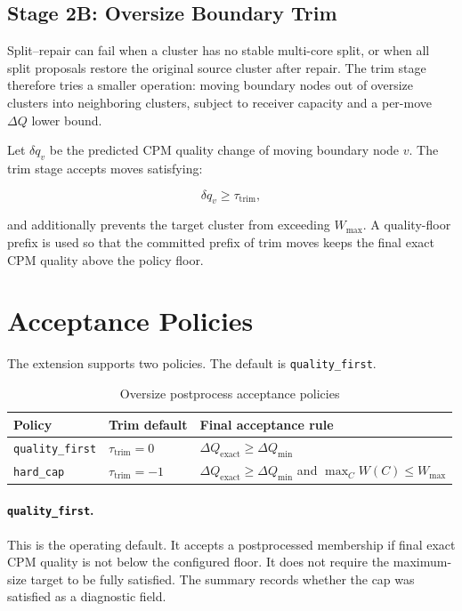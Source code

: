 \documentclass[11pt,a4paper]{article}
\begin{document}
\subsection{Stage 2B: Oversize Boundary Trim}

Split--repair can fail when a cluster has no stable multi-core split, or when
all split proposals restore the original source cluster after repair. The trim
stage therefore tries a smaller operation: moving boundary nodes out of
oversize clusters into neighboring clusters, subject to receiver capacity and
a per-move $\Delta Q$ lower bound.

Let $\delta q_v$ be the predicted CPM quality change of moving boundary node
$v$. The trim stage accepts moves satisfying:

\begin{equation}
    \delta q_v \geq \tau_{\text{trim}},
\end{equation}

and additionally prevents the target cluster from exceeding $W_{\max}$. A
quality-floor prefix is used so that the committed prefix of trim moves keeps
the final exact CPM quality above the policy floor.

\section{Acceptance Policies}

The extension supports two policies. The default is \texttt{quality\_first}.

\begin{table}[h]
\centering
\caption{Oversize postprocess acceptance policies}
\begin{tabular}{lll}
\toprule
Policy & Trim default & Final acceptance rule \\
\midrule
\texttt{quality\_first}
    & $\tau_{\text{trim}} = 0$
    & $\Delta Q_{\text{exact}} \geq \Delta Q_{\min}$ \\
\texttt{hard\_cap}
    & $\tau_{\text{trim}} = -1$
    & $\Delta Q_{\text{exact}} \geq \Delta Q_{\min}$ and
      $\max_C W(C) \leq W_{\max}$ \\
\bottomrule
\end{tabular}
\end{table}

\paragraph{\texttt{quality\_first}.}
This is the operating default. It accepts a postprocessed membership if final
exact CPM quality is not below the configured floor. It does not require the
maximum-size target to be fully satisfied. The summary records whether the cap
was satisfied as a diagnostic field.
\end{document}
